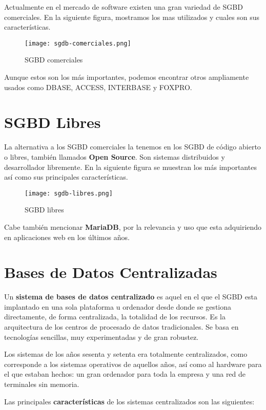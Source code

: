 Actualmente en el mercado de software existen una gran variedad de SGBD comerciales. En la siguiente figura, mostramos los mas utilizados y cuales son sus características.

\begin{figure}[ht]
    \centering
    \texttt{[image: sgdb-comerciales.png]}
    \caption{SGBD comerciales}
\end{figure}

Aunque estos son los más importantes, podemos encontrar otros ampliamente usados como DBASE, ACCESS, INTERBASE y FOXPRO.

\section{SGBD Libres}
La alternativa a los SGBD comerciales la tenemos en los SGBD de código abierto o libres, también llamados \textbf{Open Source}. Son sistemas distribuidos y desarrollador libremente. En la siguiente figura se muestran los más importantes así como sus principales características.

\begin{figure}[ht]
    \centering
    \texttt{[image: sgdb-libres.png]}
    \caption{SGBD libres}
\end{figure}

Cabe también mencionar \textbf{MariaDB}, por la relevancia y uso que esta adquiriendo en aplicaciones web en los últimos años.

\section{Bases de Datos Centralizadas}
Un \textbf{sistema de bases de datos centralizado} es aquel en el que el SGBD esta implantado en una sola plataforma u ordenador desde donde se gestiona directamente, de forma centralizada, la totalidad de los recursos. Es la arquitectura de los centros de procesado de datos tradicionales. Se basa en tecnologías sencillas, muy experimentadas y de gran robustez.

Los sistemas de los años sesenta y setenta era totalmente centralizados, como corresponde a los sistemas operativos de aquellos años, así como al hardware para el que estaban hechos: un gran ordenador para toda la empresa y una red de terminales sin memoria.

Las principales \textbf{características} de los sistemas centralizados son las siguientes:


